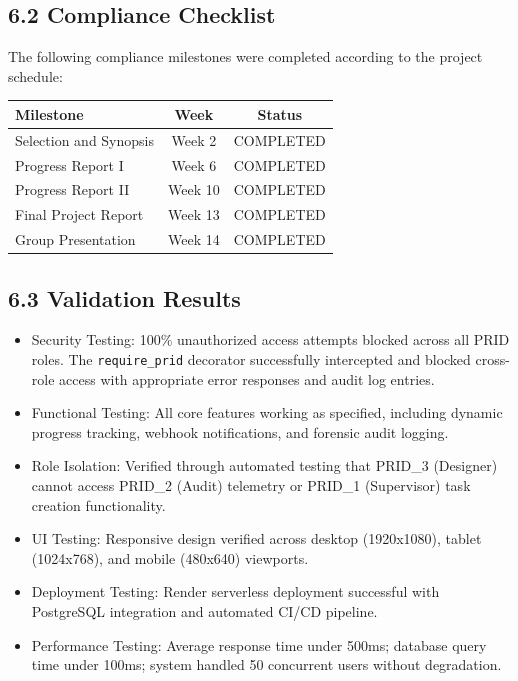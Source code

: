 ﻿\documentclass[12pt]{article}
\begin{document}
\subsection*{6.2 Compliance Checklist}
The following compliance milestones were completed according to the project schedule:
\begin{center}
\begin{tabular}{|l|c|c|}
\hline
\textbf{Milestone} & \textbf{Week} & \textbf{Status} \\ \hline
Selection and Synopsis & Week 2 & COMPLETED \\ \hline
Progress Report I & Week 6 & COMPLETED \\ \hline
Progress Report II & Week 10 & COMPLETED \\ \hline
Final Project Report & Week 13 & COMPLETED \\ \hline
Group Presentation & Week 14 & COMPLETED \\ \hline
\end{tabular}
\end{center}

\subsection*{6.3 Validation Results}
\begin{itemize}
\item {\color{secondary}Security Testing:} 100\% unauthorized access attempts blocked across all PRID roles. The \texttt{require\_prid} decorator successfully intercepted and blocked cross-role access with appropriate error responses and audit log entries.
\item {\color{secondary}Functional Testing:} All core features working as specified, including dynamic progress tracking, webhook notifications, and forensic audit logging.
\item {\color{secondary}Role Isolation:} Verified through automated testing that PRID\_3 (Designer) cannot access PRID\_2 (Audit) telemetry or PRID\_1 (Supervisor) task creation functionality.
\item {\color{secondary}UI Testing:} Responsive design verified across desktop (1920x1080), tablet (1024x768), and mobile (480x640) viewports.
\item {\color{secondary}Deployment Testing:} Render serverless deployment successful with PostgreSQL integration and automated CI/CD pipeline.
\item {\color{secondary}Performance Testing:} Average response time under 500ms; database query time under 100ms; system handled 50 concurrent users without degradation.
\end{itemize}
\end{document}
